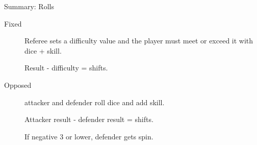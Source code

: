 \begin{sidebox}{Summary: Rolls}
\begin{description}
\item[Fixed]
Referee sets a difficulty value and the player must meet or exceed it with dice + skill.

Result - difficulty = shifts.

\item[Opposed]
attacker and defender roll dice and add skill.

Attacker result - defender result = shifts.

If negative 3 or lower, defender gets spin.

\end{description}
\end{sidebox}